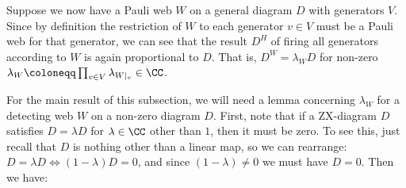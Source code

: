 
Suppose we now have a Pauli web $W$ on a general diagram $D$ with generators $V$.
Since by definition the restriction of $W$ to each generator $v \in V$ must be a Pauli web for that generator, we can see that the result $D^{H}$ of firing all generators according to $W$ is again proportional to $D$.
That is, $D^{W} = \lambda_W D$ for non-zero $\lambda_W \coloneqq \prod_{v \in V} \lambda_{W|_v} \in \CC$.

For the main result of this subsection, we will need a lemma concerning $\lambda_W$ for a detecting web $W$ on a non-zero diagram $D$.
First, note that if a ZX-diagram $D$ satisfies $D = \lambda D$ for $\lambda \in \CC$ other than $1$, then it must be zero.
To see this, just recall that $D$ is nothing other than a linear map, so we can rearrange: $D = \lambda D \iff (1 - \lambda)D = 0$, and since $(1 - \lambda) \neq 0$ we must have $D = 0$.
Then we have:


